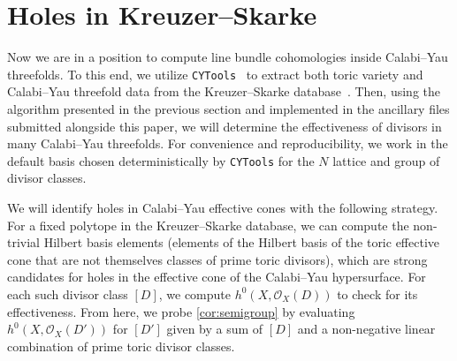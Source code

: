 \documentclass[11pt,dvipsnames]{article}
\theoremstyle{definition}
\begin{document}
\section{Holes in Kreuzer--Skarke} \label{sec:ksholes}

\noindent Now we are in a position to compute line bundle cohomologies inside Calabi--Yau threefolds. To this end, we utilize \verb+CYTools+~\cite{Demirtas:2022hqf} to extract both toric variety and Calabi--Yau threefold data from the Kreuzer--Skarke database~\cite{Kreuzer:2000xy}. Then, using the algorithm presented in the previous section and implemented in the ancillary files submitted alongside this paper, we will determine the effectiveness of divisors in many Calabi--Yau threefolds. For convenience and reproducibility, we work in the default basis chosen deterministically by \verb+CYTools+ for the $N$ lattice and group of divisor classes. 

We will identify holes in Calabi--Yau effective cones with the following strategy. For a fixed polytope in the Kreuzer--Skarke database, we can compute the non-trivial Hilbert basis elements (elements of the Hilbert basis of the toric effective cone that are not themselves classes of prime toric divisors), which are strong candidates for holes in the effective cone of the Calabi--Yau hypersurface. For each such divisor class $[D]$, we compute $h^0(X, \mathcal{O}_X(D))$ to check for its effectiveness. From here, we probe \cref{cor:semigroup} by evaluating $h^0(X, \mathcal{O}_X(D'))$ for $[D']$ given by a sum of $[D]$ and a non-negative linear combination of prime toric divisor classes. 
\end{document}
